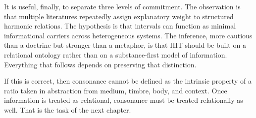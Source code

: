 It is useful, finally, to separate three levels of commitment. The observation is that multiple literatures repeatedly assign explanatory weight to structured harmonic relations. The hypothesis is that intervals can function as minimal informational carriers across heterogeneous systems. The inference, more cautious than a doctrine but stronger than a metaphor, is that HIT should be built on a relational ontology rather than on a substance-first model of information. Everything that follows depends on preserving that distinction.

If this is correct, then consonance cannot be defined as the intrinsic property of a ratio taken in abstraction from medium, timbre, body, and context. Once information is treated as relational, consonance must be treated relationally as well. That is the task of the next chapter.
